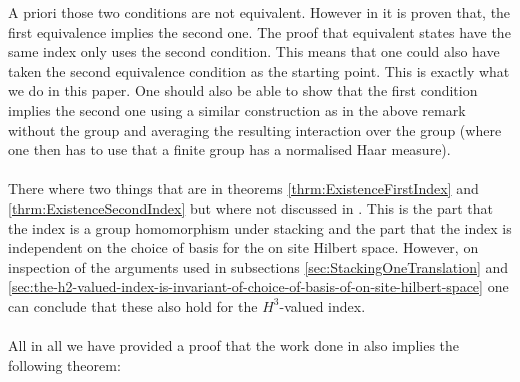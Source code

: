 \documentclass[11pt,a4paper,twoside]{article}
\numberwithin{equation}{section}
\begin{document}
A priori those two conditions are not equivalent. However in \cite{ogata2021h3gmathbb} it is proven that, the first equivalence implies the second one. The proof that equivalent states have the same index only uses the second condition. This means that one could also have taken the second equivalence condition as the starting point. This is exactly what we do in this paper. One should also be able to show that the first condition implies the second one using a similar construction as in the above remark without the group and averaging the resulting interaction over the group (where one then has to use that a finite group has a normalised Haar measure).\\\\
There where two things that are in theorems \ref{thrm:ExistenceFirstIndex} and \ref{thrm:ExistenceSecondIndex} but where not discussed in \cite{ogata2021h3gmathbb}. This is the part that the index is a group homomorphism under stacking and the part that the index is independent on the choice of basis for the on site Hilbert space. However, on inspection of the arguments used in subsections \ref{sec:StackingOneTranslation} and \ref{sec:the-h2-valued-index-is-invariant-of-choice-of-basis-of-on-site-hilbert-space} one can conclude that these also hold for the $H^3$-valued index.\\\\
All in all we have provided a proof that the work done in \cite{ogata2021h3gmathbb} also implies the following theorem:
\end{document}
